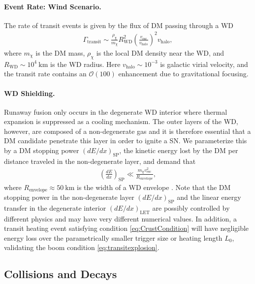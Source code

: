 \documentclass[preprintnumbers,amsmath,amssymb,prd,superscriptaddress]{revtex4}
\newcommand{\OO}{\mathcal{O}}
\def\r{\right)}
\def\l{\left(}
\begin{document}
\paragraph{Event Rate: Wind Scenario.}
The rate of transit events is given by the flux of DM passing through a WD
\begin{align}
  \Gamma_\text{transit} \sim
  \frac{\rho_{\chi}}{m_\chi} R_\text{WD}^2
  \l\frac{v_\text{esc}}{v_\text{halo}}\r^2 v_\text{halo},
\label{eq:TransitFluxCondition}
\end{align}
where $m_\chi$ is the DM mass, $\rho_\chi$ is the local DM density near the WD, and $R_\text{WD} \sim 10^{4} ~\text{km}$ is the WD radius.
Here $v_\text{halo} \sim 10^{-3}$ is galactic virial velocity, and the transit rate contains an $\OO(100)$ enhancement due to gravitational focusing.

\paragraph{WD Shielding.}
Runaway fusion only occurs in the degenerate WD interior where thermal expansion is suppressed as a cooling mechanism.
The outer layers of the WD, however, are composed of a non-degenerate gas and it is therefore essential that a DM candidate penetrate this layer in order to ignite a SN.
We parameterize this by a DM stopping power $(dE/dx)_\text{SP}$, the kinetic energy lost by the DM per distance traveled in the non-degenerate layer, and demand that
\begin{align}
\label{eq:CrustCondition}
  \left( \frac{d E}{d x} \right)_\text{SP} \ll
  \frac{m_\chi v^2_\text{esc}}{R_\text{envelope}},
\end{align}
where $R_\text{envelope} \approx 50 ~\text{km}$ is the width of a WD envelope \cite{KippenhahnWeigert}.
Note that the DM stopping power in the non-degenerate layer $(dE/dx)_\text{SP}$ and the linear energy transfer in the degenerate interior $(dE/dx)_\text{LET}$ are possibly controlled by different physics and may have very different numerical values.
In addition, a transit heating event satisfying condition \eqref{eq:CrustCondition} will have negligible energy loss over the parametrically smaller trigger size or heating length $L_0$, validating the boom condition \eqref{eq:transitexplosion}.

\subsection{Collisions and Decays}
\end{document}
